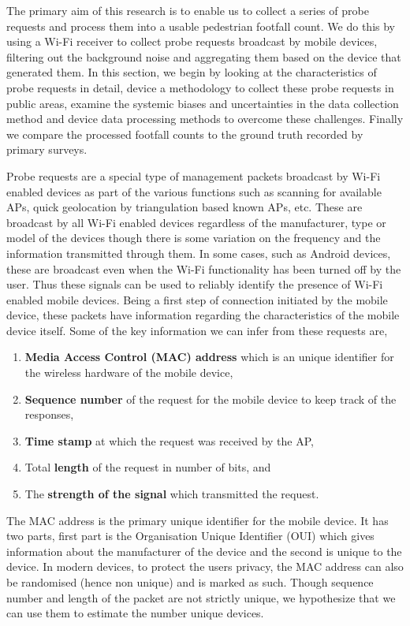 The primary aim of this research is to enable us to collect a series of probe requests and process them into a usable pedestrian footfall count. 
We do this by using a Wi-Fi receiver to collect probe requests broadcast by mobile devices, filtering out the background noise and aggregating them based on the device that generated them.
In this section, we begin by looking at the characteristics of probe requests in detail, device a methodology to collect these probe requests in public areas, examine the systemic biases and uncertainties in the data collection method and device data processing methods to overcome these challenges.
Finally we compare the processed footfall counts to the ground truth recorded by primary surveys.

Probe requests are a special type of management packets broadcast by Wi-Fi enabled devices as part of the various functions such as scanning for available APs, quick geolocation by triangulation based known APs, etc.
These are broadcast by all Wi-Fi enabled devices regardless of the manufacturer, type or model of the devices though there is some variation on the frequency and the information transmitted through them.
In some cases, such as Android devices, these are broadcast even when the Wi-Fi functionality has been turned off by the user.
Thus these signals can be used to reliably identify the presence of Wi-Fi enabled mobile devices.
Being a first step of connection initiated by the mobile device, these packets have information regarding the characteristics of the mobile device itself. Some of the key information we can infer from these requests are,
\begin{enumerate}
	\item \textbf{Media Access Control (MAC) address} which is an unique identifier for the wireless hardware of the mobile device,
	\item \textbf{Sequence number} of the request for the mobile device to keep track of the responses,
	\item \textbf{Time stamp} at which the request was received by the AP,
	\item Total \textbf{length} of the request in number of bits, and 
	\item The \textbf{strength of the signal} which transmitted the request.
\end{enumerate}
The MAC address is the primary unique identifier for the mobile device.
It has two parts, first part is the Organisation Unique Identifier (OUI) which gives information about the manufacturer of the device and the second is unique to the device. In modern devices, to protect the users privacy, the MAC address can also be randomised (hence non unique) and is marked as such. Though sequence number and length of the packet are not strictly unique, we hypothesize that we can use them to estimate the number unique devices.

